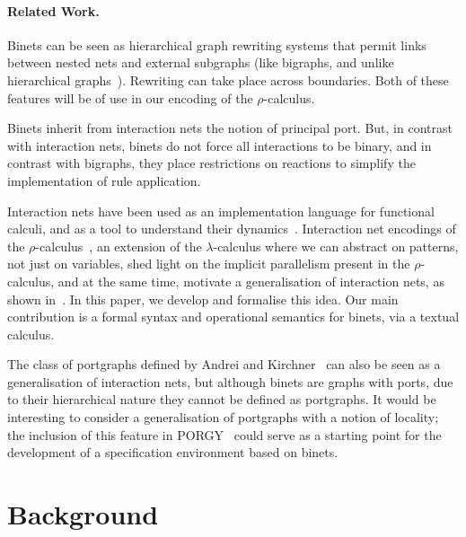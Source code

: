 \documentclass[copyright,creativecommons]{eptcs}
\begin{document}
\paragraph{Related Work.}
Binets can be seen as hierarchical graph rewriting systems that permit
links between nested nets and external subgraphs (like bigraphs, and
unlike hierarchical graphs~\cite{Drewes-Hoffmann-Plump:00}). Rewriting
can take place across boundaries.  Both of these features will be of
use in our encoding of the $\rho$-calculus.

Binets inherit from interaction nets the notion of principal
port. But, in contrast with interaction nets, binets do not force all
interactions to be binary, and in contrast with bigraphs, they place
restrictions on reactions to simplify the implementation of rule application.

Interaction nets have been used as an implementation language for
functional calculi, and as a tool to understand their
dynamics~\cite{GonthierG:geoolr,AspertiA:bolhom,MackieIC:phd,MackieIC:efflei,FernandezM:terrgi,FernandezM:inMCpa,FleutotF:encoci}.
Interaction net encodings of the
$\rho$-calculus~\cite{rhoCalIGLP-I+II-2001}, an extension of the
$\lambda$-calculus where we can abstract on patterns, not just on
variables, shed light on the implicit parallelism present in the
$\rho$-calculus, and at the same time, motivate a generalisation of
interaction nets, as shown in~\cite{EXPRESS}.  In this paper, we
develop and formalise this idea. Our main contribution is a formal
syntax and operational semantics for binets, via a textual calculus.

The class of portgraphs defined by Andrei and Kirchner~\cite{AndreiK08}
can also be seen as a generalisation of interaction nets, but although
binets are graphs with ports, due to their hierarchical nature they
cannot be defined as portgraphs. It would be interesting to consider a
generalisation of portgraphs with a notion of locality; the inclusion
of this feature in PORGY~\cite{AndreiO:PORGY} could serve as a
starting point for the development of a specification environment
based on binets.



\section{Background}
\label{sec:bg}
\end{document}
